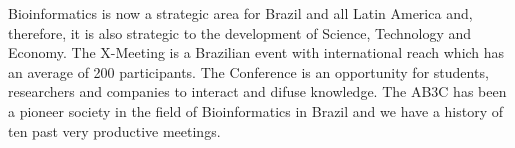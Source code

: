 	
Bioinformatics is now a strategic area for Brazil and all Latin America and,
therefore, it is also strategic to the development of Science, Technology and
Economy. The X-Meeting is a Brazilian event with international reach which has
an average of 200 participants. The Conference is an opportunity for students,
researchers and companies to interact and difuse knowledge. The AB3C has been a
pioneer society in the field of Bioinformatics in Brazil and we have a history
of ten past very productive meetings.

%
%
